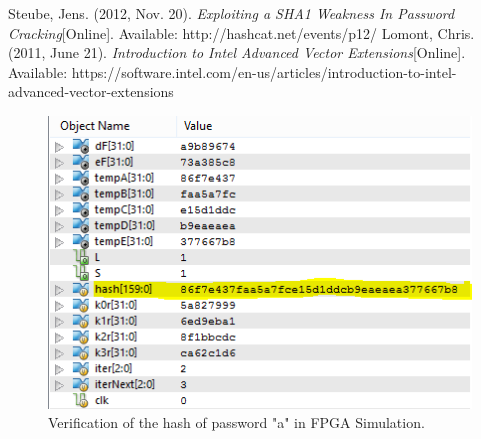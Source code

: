 \documentclass[letterpaper, 10 pt, conference]{ieeeconf}  %
\begin{document}
















\begin{thebibliography}{99}

 Steube, Jens. (2012, Nov. 20). \emph{Exploiting a SHA1 Weakness In Password Cracking}[Online]. Available: http://hashcat.net/events/p12/
 Lomont, Chris. (2011, June 21). \emph{Introduction to Intel Advanced Vector Extensions}[Online]. Available: https://software.intel.com/en-us/articles/introduction-to-intel-advanced-vector-extensions
 

\end{thebibliography}

\begin{figure}[thpb]
	\centering
	\includegraphics[scale=.75]{hash}
    \caption{Verification of the hash of password "a" in FPGA Simulation.}
\end{figure}
\end{document}
